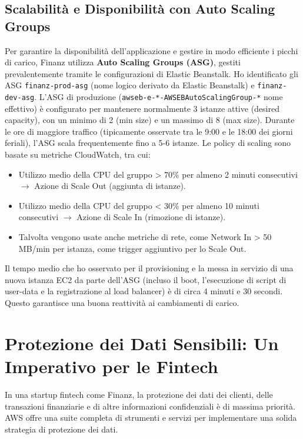 \subsection{Scalabilità e Disponibilità con Auto Scaling Groups}
\label{subsec:auto-scaling_cap2}
Per garantire la disponibilità dell'applicazione e gestire in modo efficiente i picchi di carico, Finanz utilizza \textbf{Auto Scaling Groups (ASG)}, gestiti prevalentemente tramite le configurazioni di Elastic Beanstalk. Ho identificato gli ASG \texttt{finanz-prod-asg} (nome logico derivato da Elastic Beanstalk) e \texttt{finanz-dev-asg}.
L'ASG di produzione (\texttt{awseb-e-*-AWSEBAutoScalingGroup-*} nome effettivo) è configurato per mantenere normalmente 3 istanze attive (desired capacity), con un minimo di 2 (min size) e un massimo di 8 (max size). Durante le ore di maggiore traffico (tipicamente osservate tra le 9:00 e le 18:00 dei giorni feriali), l'ASG scala frequentemente fino a 5-6 istanze. Le policy di scaling sono basate su metriche CloudWatch, tra cui:
\begin{itemize}
    \item Utilizzo medio della CPU del gruppo > 70\% per almeno 2 minuti consecutivi $\rightarrow$ Azione di Scale Out (aggiunta di istanze).
    \item Utilizzo medio della CPU del gruppo < 30\% per almeno 10 minuti consecutivi $\rightarrow$ Azione di Scale In (rimozione di istanze).
    \item Talvolta vengono usate anche metriche di rete, come Network In > 50 MB/min per istanza, come trigger aggiuntivo per lo Scale Out.
\end{itemize}
Il tempo medio che ho osservato per il provisioning e la messa in servizio di una nuova istanza EC2 da parte dell'ASG (incluso il boot, l'esecuzione di script di user-data e la registrazione al load balancer) è di circa 4 minuti e 30 secondi. Questo garantisce una buona reattività ai cambiamenti di carico.

\section{Protezione dei Dati Sensibili: Un Imperativo per le Fintech}
\label{sec:data-protection_cap2}
In una startup fintech come Finanz, la protezione dei dati dei clienti, delle transazioni finanziarie e di altre informazioni confidenziali è di massima priorità. AWS offre una suite completa di strumenti e servizi per implementare una solida strategia di protezione dei dati.

